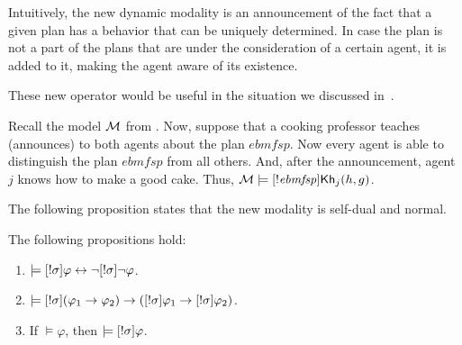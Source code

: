 \medskip

Intuitively, the new dynamic modality is an announcement of the fact that a given plan has a behavior that can be uniquely determined. In case the plan is not a part of the plans that are under the consideration of a certain agent, it is added to it, making the agent aware of its existence. 

\medskip

These new operator would be useful in the situation we discussed in~.

\medskip 

\begin{example}\label{ex:sref}
Recall the model $\mathcal{M}$ from .
Now, suppose that a cooking professor teaches (announces) to both agents about the plan $\mathit{ebmfsp}$.
Now every agent is able to distinguish the plan $\mathit{ebmfsp}$ from all others.
And, after the announcement, agent~$j$ knows how to make a good cake.
Thus, $\mathcal{M} \models [!\mathit{ebmfsp}] {\sf Kh}_j(h,g)$.
\end{example}

\medskip

The following proposition states that the new modality is self-dual and normal.

\medskip 

\begin{proposition}
The following propositions hold:
\begin{enumerate}
\item $\models [!\sigma]\varphi \leftrightarrow \neg[!\sigma]\neg\varphi$. 
\item $\models [!\sigma](\varphi_1 \rightarrow \varphi_2) \rightarrow ([!\sigma]\varphi_1 \rightarrow [!\sigma]\varphi_2)$.
\item If $\models \varphi$, then $\models [!\sigma]\varphi$.
\end{enumerate}
\end{proposition}

\medskip 


